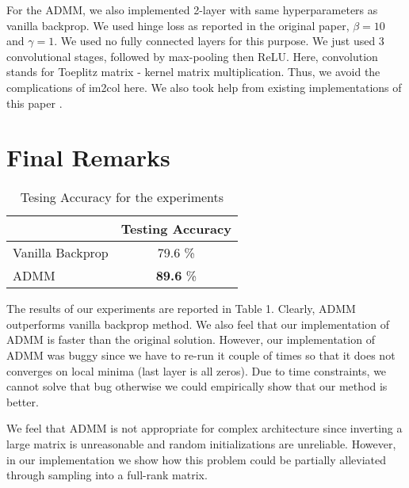 \documentclass[12pt]{article}
\begin{document}
For the ADMM, we also implemented 2-layer with same hyperparameters as vanilla backprop.
We used hinge loss as reported in the original paper, $\beta = 10$ and $\gamma = 1$.
We used no fully connected layers for this purpose.
We just used 3 convolutional stages, followed by max-pooling then ReLU.
Here, convolution stands for Toeplitz matrix - kernel matrix multiplication.
Thus, we avoid the complications of im2col here.
We also took help from existing implementations of this paper \cite{dongzhuoyao}.

\section{Final Remarks}

\begin{table}[h]
	\centering
	\label{my-label}
	\begin{tabular}{@{}lc@{}}
		\toprule
		\textbf{}        & \textbf{Testing Accuracy} \\ \midrule
		Vanilla Backprop & 79.6 \%                   \\
		ADMM             & \textbf{89.6} \%                   \\ \bottomrule
	\end{tabular}
\caption{Tesing Accuracy for the experiments}
\end{table}

The results of our experiments are reported in Table 1.
Clearly, ADMM outperforms vanilla backprop method.
We also feel that our implementation of ADMM is faster than the original solution.
However, our implementation of ADMM was buggy since we have to re-run it couple of times so that it does not converges on local minima (last layer is all zeros).
Due to time constraints, we cannot solve that bug otherwise we could empirically show that our method is better.

We feel that ADMM is not appropriate for complex architecture since inverting a large matrix is unreasonable and random initializations are unreliable.
However, in our implementation we show how this problem could be partially alleviated through sampling into a full-rank matrix.



\end{document}
